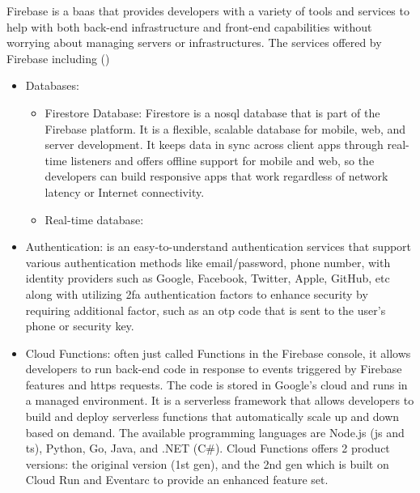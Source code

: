 \begin{multicols}{2}
      Firebase is a \acrshort{baas} that provides developers with a variety of tools and services to help with both
      back-end infrastructure and front-end capabilities without worrying about managing servers or infrastructures.
      The services offered by Firebase including (\cite{firebaseproducts})
      \begin{itemize}
            \item Databases:
                  \begin{itemize}
                        \item Firestore Database: Firestore is a \acrshort{nosql} database that is part of the Firebase
                              platform. It is a flexible, scalable database for mobile, web, and server development. It keeps
                              data in sync across client apps through real-time listeners and offers offline support for mobile
                              and web, so the developers can build responsive apps that work regardless of network latency or
                              Internet connectivity.
                        \item Real-time database:
                  \end{itemize}
            \item Authentication: is an easy-to-understand authentication services that support various authentication
                  methods like email/password, phone number, with identity providers such as Google, Facebook, Twitter,
                  Apple, GitHub, \acrshort{etc}
                  along with utilizing \acrshort{2fa} authentication factors to enhance security by requiring additional
                  factor, such as an \acrshort{otp} code that is sent to the user's phone or security key.
            \item Cloud Functions: often just called Functions in the Firebase console, it allows developers to run
                  back-end code in response to events triggered by Firebase features and \acrshort{https} requests.
                  The code is stored in Google's cloud and runs in a managed environment. It is a serverless framework
                  that allows developers to build and deploy serverless functions that automatically scale up and down
                  based on demand. The available programming languages are Node.js (\acrshort{js} and \acrshort{ts}),
                  Python, Go, Java, and .NET (C\#). Cloud Functions offers 2 product versions: the original version
                  (1st gen), and the 2nd gen which is built on Cloud Run and Eventarc to provide an enhanced feature set.

\end{itemize}
\end{multicols}
